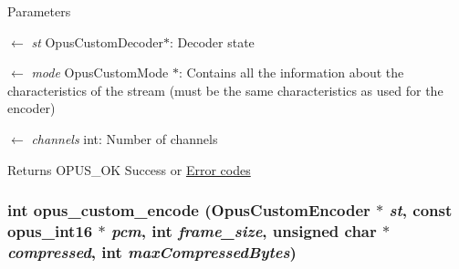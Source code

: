 \begin{DoxyParams}{Parameters}
\item[\mbox{$\leftarrow$} {\em st}]{\ttfamily OpusCustomDecoder$\ast$}: Decoder state \item[\mbox{$\leftarrow$} {\em mode}]{\ttfamily OpusCustomMode $\ast$}: Contains all the information about the characteristics of the stream (must be the same characteristics as used for the encoder) \item[\mbox{$\leftarrow$} {\em channels}]{\ttfamily int}: Number of channels \end{DoxyParams}
\begin{DoxyReturn}{Returns}
OPUS\_\-OK Success or \hyperlink{group__opus__errorcodes}{Error codes} 
\end{DoxyReturn}
\hypertarget{group__opus__custom_ga21d6b0c4106ed5777a8632eed97d4cdc}{
\subsubsection[{opus\_\-custom\_\-encode}]{\setlength{\rightskip}{0pt plus 5cm}int opus\_\-custom\_\-encode ({\bf OpusCustomEncoder} $\ast$ {\em st}, \/  const {\bf opus\_\-int16} $\ast$ {\em pcm}, \/  int {\em frame\_\-size}, \/  unsigned char $\ast$ {\em compressed}, \/  int {\em maxCompressedBytes})}}
\label{group__opus__custom_ga21d6b0c4106ed5777a8632eed97d4cdc}


